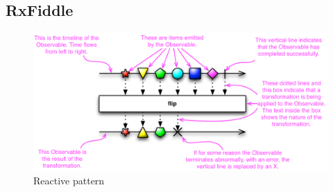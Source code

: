 	

	\subsection{RxFiddle}





\begin{figure}[!h]
	\centering
	\includegraphics[scale=0.5,trim=0 0 0 0]{gfx/rxjs-reactive-pattern2.png}
	\caption{Reactive pattern \protect\cite{ReactiveXobservable}}
	\label{fig:rxjs-reactive-pattern}
\end{figure}


